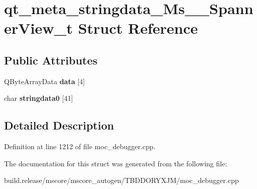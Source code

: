 \hypertarget{structqt__meta__stringdata___ms_____spanner_view__t}{}\section{qt\+\_\+meta\+\_\+stringdata\+\_\+\+Ms\+\_\+\+\_\+\+Spanner\+View\+\_\+t Struct Reference}
\label{structqt__meta__stringdata___ms_____spanner_view__t}
\subsection*{Public Attributes}
\begin{DoxyCompactItemize}
\item 
\mbox{\label{structqt__meta__stringdata___ms_____spanner_view__t_a7579893edffd085992d5b96efee7ee34}} 
Q\+Byte\+Array\+Data {\bfseries data} \mbox{[}4\mbox{]}
\item 
\mbox{\label{structqt__meta__stringdata___ms_____spanner_view__t_a4ee3a5128d0364c43b998bce15604ef5}} 
char {\bfseries stringdata0} \mbox{[}41\mbox{]}
\end{DoxyCompactItemize}


\subsection{Detailed Description}


Definition at line 1212 of file moc\+\_\+debugger.\+cpp.



The documentation for this struct was generated from the following file\+:\begin{DoxyCompactItemize}
\item 
build.\+release/mscore/mscore\+\_\+autogen/\+T\+B\+D\+D\+O\+R\+Y\+X\+J\+M/moc\+\_\+debugger.\+cpp\end{DoxyCompactItemize}
